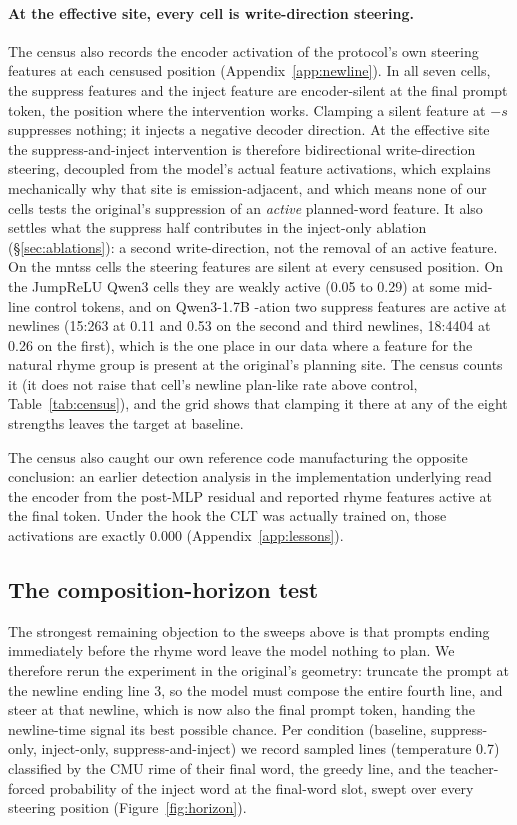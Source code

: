 \documentclass[11pt]{article}
\begin{document}
\paragraph{At the effective site, every cell is write-direction steering.}
The census also records the encoder activation of the protocol's own steering features at each censused position (Appendix~\ref{app:newline}). In all seven cells, the suppress features and the inject feature are encoder-silent at the final prompt token, the position where the intervention works. Clamping a silent feature at $-s$ suppresses nothing; it injects a negative decoder direction. At the effective site the suppress-and-inject intervention is therefore bidirectional write-direction steering, decoupled from the model's actual feature activations, which explains mechanically why that site is emission-adjacent, and which means none of our cells tests the original's suppression of an \emph{active} planned-word feature. It also settles what the suppress half contributes in the inject-only ablation (\S\ref{sec:ablations}): a second write-direction, not the removal of an active feature. On the mntss cells the steering features are silent at every censused position. On the JumpReLU Qwen3 cells they are weakly active (0.05 to 0.29) at some mid-line control tokens, and on Qwen3-1.7B -ation two suppress features are active at newlines (15:263 at 0.11 and 0.53 on the second and third newlines, 18:4404 at 0.26 on the first), which is the one place in our data where a feature for the natural rhyme group is present at the original's planning site. The census counts it (it does not raise that cell's newline plan-like rate above control, Table~\ref{tab:census}), and the grid shows that clamping it there at any of the eight strengths leaves the target at baseline.

The census also caught our own reference code manufacturing the opposite conclusion: an earlier detection analysis in the implementation underlying \citet{jacopin2026prolepsis} read the encoder from the post-MLP residual and reported rhyme features active at the final token. Under the hook the CLT was actually trained on, those activations are exactly 0.000 (Appendix~\ref{app:lessons}).

\subsection{The composition-horizon test}
\label{sec:horizon}

The strongest remaining objection to the sweeps above is that prompts ending immediately before the rhyme word leave the model nothing to plan. We therefore rerun the experiment in the original's geometry: truncate the prompt at the newline ending line 3, so the model must compose the entire fourth line, and steer at that newline, which is now also the final prompt token, handing the newline-time signal its best possible chance. Per condition (baseline, suppress-only, inject-only, suppress-and-inject) we record sampled lines (temperature 0.7) classified by the CMU rime of their final word, the greedy line, and the teacher-forced probability of the inject word at the final-word slot, swept over every steering position (Figure~\ref{fig:horizon}).
\end{document}
